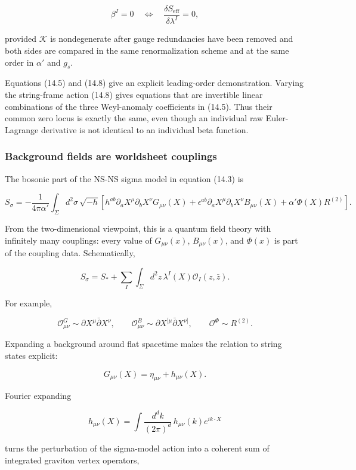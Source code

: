 \documentclass[
  10pt,
  a4paper,
  openany]{book}
\begin{document}
\[
\boxed{
\beta^I=0
\quad\Longleftrightarrow\quad
\frac{\delta S_{\mathrm{eff}}}{\delta\lambda^I}=0,
}
\]

provided \(\mathcal K\) is nondegenerate after gauge redundancies have
been removed and both sides are compared in the same renormalization
scheme and at the same order in \(\alpha'\) and \(g_s\).

Equations (14.5) and (14.8) give an explicit leading-order
demonstration. Varying the string-frame action (14.8) gives equations
that are invertible linear combinations of the three Weyl-anomaly
coefficients in (14.5). Thus their common zero locus is exactly the
same, even though an individual raw Euler-Lagrange derivative is not
identical to an individual beta function.

\subsubsection{Background fields are worldsheet
couplings}\label{background-fields-are-worldsheet-couplings}

The bosonic part of the NS-NS sigma model in equation (14.3) is

\[
S_\sigma
=-\frac{1}{4\pi\alpha'}
\int_\Sigma d^2\sigma\,\sqrt{-h}
\left[
h^{ab}\partial_aX^\mu\partial_bX^\nu G_{\mu\nu}(X)
+\epsilon^{ab}\partial_aX^\mu\partial_bX^\nu B_{\mu\nu}(X)
+\alpha'\Phi(X)R^{(2)}
\right].
\]

From the two-dimensional viewpoint, this is a quantum field theory with
infinitely many couplings: every value of \(G_{\mu\nu}(x)\),
\(B_{\mu\nu}(x)\), and \(\Phi(x)\) is part of the coupling data.
Schematically,

\[
S_\sigma
=S_*+\sum_I\int_\Sigma d^2z\,
\lambda^I(X)\mathcal O_I(z,\bar z).
\]

For example,

\[
\mathcal O^G_{\mu\nu}
\sim \partial X^\mu\bar\partial X^\nu,
\qquad
\mathcal O^B_{\mu\nu}
\sim \partial X^{[\mu}\bar\partial X^{\nu]},
\qquad
\mathcal O^\Phi
\sim R^{(2)}.
\]

Expanding a background around flat spacetime makes the relation to
string states explicit:

\[
G_{\mu\nu}(X)
=\eta_{\mu\nu}+h_{\mu\nu}(X).
\]

Fourier expanding

\[
h_{\mu\nu}(X)
=\int\frac{d^dk}{(2\pi)^d}\,
h_{\mu\nu}(k)e^{ik\cdot X}
\]

turns the perturbation of the sigma-model action into a coherent sum of
integrated graviton vertex operators,
\end{document}
